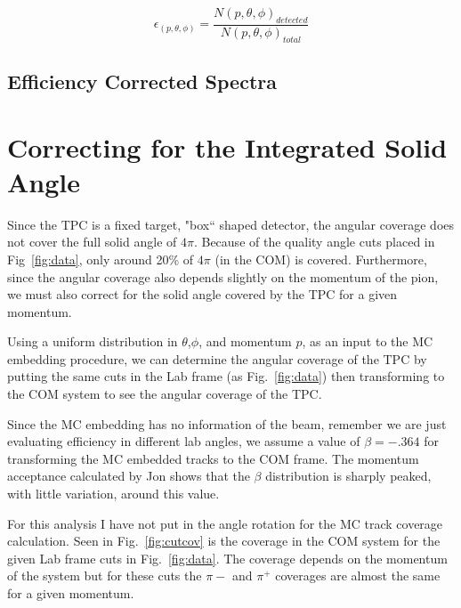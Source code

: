 \documentclass[12pt, letterpaper, twoside]{article}
\begin{document}
 \begin{equation} 
 \label{eq:eff_cal}
 \epsilon_{(p,\theta,\phi)} = \frac{N(p,\theta,\phi)_{detected}}{N(p,\theta,\phi)_{total}}
 \end{equation}  
  
  
\subsection{Efficiency Corrected Spectra}
 
 
 \section{Correcting for the Integrated Solid Angle}
 Since the TPC is a fixed target, "box`` shaped detector, the angular coverage does not cover the full solid angle of $4\pi$. Because of the quality angle cuts placed in Fig~\ref{fig:data}, only around 20\% of $4\pi$ (in the COM) is covered. Furthermore, since the angular coverage also depends slightly on the momentum of the pion, we must also correct for the solid angle covered by the TPC for a given momentum. 
 
 Using a uniform distribution in $\theta$,$\phi$, and momentum $p$, as an input to the MC embedding procedure, we can determine the angular coverage of the TPC by putting the same cuts in the Lab frame (as Fig.~\ref{fig:data}) then transforming to the COM system to see the angular coverage of the TPC.
 
 Since the MC embedding has no information of the beam, remember we are just evaluating efficiency in different lab angles, we assume a value of $\beta = -.364$ for transforming the MC embedded tracks to the COM frame. The momentum acceptance calculated by Jon shows that the $\beta$ distribution is sharply peaked, with little variation, around this value. 
 
For this analysis I have not put in the angle rotation for the MC track coverage calculation. Seen in Fig.~\ref{fig:cutcov} is the coverage in the COM system for the given Lab frame cuts in Fig.~\ref{fig:data}. The coverage depends on the momentum of the system but for these cuts the $\pi{-}$ and $\pi^+$ coverages are almost the same for a given momentum. 
\end{document}
